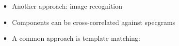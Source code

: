 \documentclass[t, xcolor={dvipsnames}]{beamer}
\begin{document}
\begin{frame}[fragile]
  \vspace{0.5cm}
  \begin{addmargin}{0.5cm}
    \begin{itemize}
      \item Another approach: image recognition
      \item Components can be cross-correlated against specgrams
      \item A common approach is template matching:
    \end{itemize}


  \end{addmargin}


\end{frame}
\end{document}
